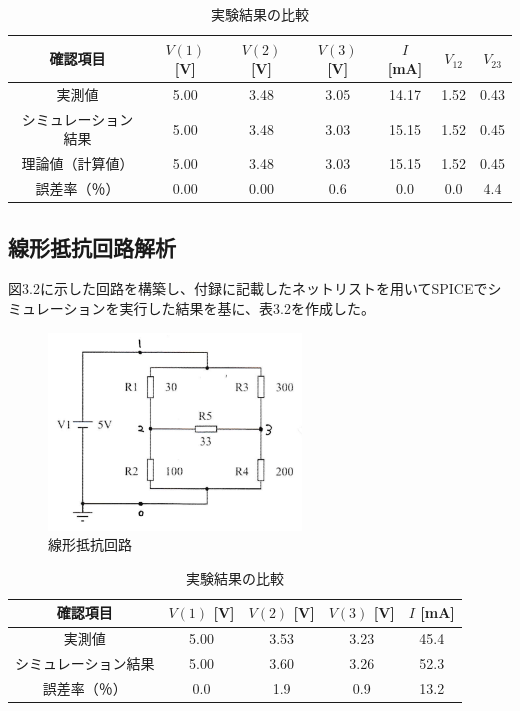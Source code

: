 \documentclass{jlreq}
\numberwithin{equation}{section}
\begin{document}
\begin{table}[H]
  \centering
  \caption{実験結果の比較}
  \begin{tabular}{|c|c|c|c|c|c|c|}
    \hline
    確認項目 & \( V(1) \) [V] & \( V(2) \) [V] & \( V(3) \) [V] & \( I \) [mA] & \( V_{12} \) & \( V_{23} \) \\ \hline
    実測値 & 5.00 & 3.48 & 3.05 & 14.17 & 1.52 & 0.43 \\ \hline
    シミュレーション結果 & 5.00 & 3.48 & 3.03 & 15.15 & 1.52 & 0.45 \\ \hline
    理論値（計算値） & 5.00 & 3.48 & 3.03 & 15.15 & 1.52 & 0.45 \\ \hline
    誤差率（％） & 0.00 & 0.00 & 0.6 & 0.0 & 0.0 & 4.4 \\ \hline
  \end{tabular}
\end{table}

\subsection{線形抵抗回路解析}
図3.2に示した回路を構築し、付録に記載したネットリストを用いてSPICEでシミュレーションを実行した結果を基に、表3.2を作成した。

\begin{figure}[H]
  \centering
  \includegraphics[width=0.6\textwidth]{assets/senkeikairo.png}
  \caption{線形抵抗回路}
\end{figure}

\begin{table}[H]
  \centering
  \caption{実験結果の比較}
  \begin{tabular}{|c|c|c|c|c|}
    \hline
    確認項目 & \( V(1) \) [V] & \( V(2) \) [V] & \( V(3) \) [V] & \( I \) [mA] \\ \hline
    実測値 & 5.00 & 3.53 & 3.23 & 45.4 \\ \hline
    シミュレーション結果 & 5.00 & 3.60 & 3.26 & 52.3 \\ \hline
    誤差率（％） & 0.0 & 1.9 & 0.9 & 13.2 \\ \hline
  \end{tabular}
\end{table}
\end{document}
